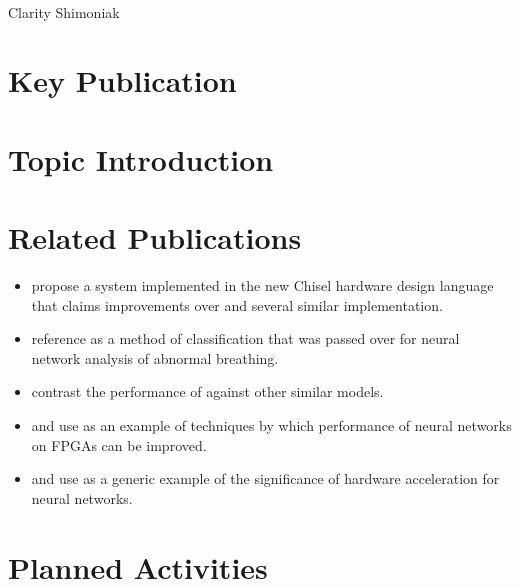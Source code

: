 \documentclass[12pt,letterpaper,english]{article}
\begin{document}
\begin{center}
	{\Huge\todo[Title]} \\
	Clarity Shimoniak
\end{center}

\section*{Key Publication}



\section*{Topic Introduction}



\section*{Related Publications}

\begin{itemize}
	\item \citeauthor{madineni2023parameterizable} propose a system implemented
	in the new Chisel hardware design language that claims improvements over
	 and several similar implementation.
	\item \citeauthor{baedorf2023reverse} reference  as a method
	of classification that was passed over for neural network analysis of
	abnormal breathing.
	\item \citeauthor{phipps2023pre} contrast the performance of
	 against other similar models.
	\item \citeauthor*{pistellato2023quantization} and \citeauthor*{yan2023end}
	use  as an example of techniques by which performance of
	neural networks on FPGAs can be improved.
	\item \citeauthor*{aydin2023fpga} and \citeauthor*{naufal2023comparative}
	use  as a generic example of the significance of hardware
	acceleration for neural networks.
\end{itemize}


\section*{Planned Activities}



\newpage
\printbibliography
\end{document}
